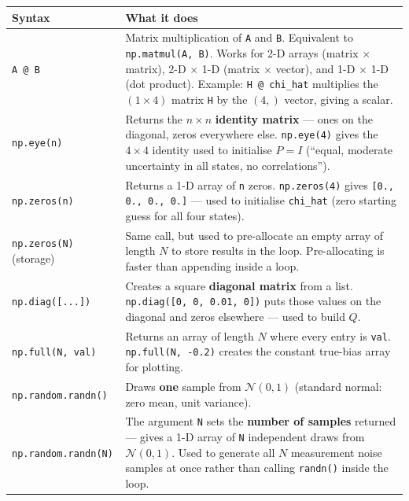 \documentclass[12pt, a4paper]{article}
\begin{document}
\begin{center}
\renewcommand{\arraystretch}{1.6}
\begin{tabular}{p{4.5cm} p{9.0cm}}
  \toprule
  \textbf{Syntax} & \textbf{What it does} \\
  \midrule
  \texttt{A @ B}
    & Matrix multiplication of \texttt{A} and \texttt{B}.
      Equivalent to \texttt{np.matmul(A, B)}.
      Works for 2-D arrays (matrix $\times$ matrix),
      2-D $\times$ 1-D (matrix $\times$ vector), and
      1-D $\times$ 1-D (dot product).
      Example: \texttt{H @ chi\_hat} multiplies the
      $(1\times4)$ matrix \texttt{H} by the $(4,)$ vector,
      giving a scalar. \\
  \texttt{np.eye(n)}
    & Returns the $n \times n$ \textbf{identity matrix} ---
      ones on the diagonal, zeros everywhere else.
      \texttt{np.eye(4)} gives the $4\times4$ identity used to
      initialise $P = I$ (``equal, moderate uncertainty in all
      states, no correlations''). \\
  \texttt{np.zeros(n)}
    & Returns a 1-D array of \texttt{n} zeros.
      \texttt{np.zeros(4)} gives \texttt{[0., 0., 0., 0.]} ---
      used to initialise \texttt{chi\_hat} (zero starting guess
      for all four states). \\
  \texttt{np.zeros(N)} (storage)
    & Same call, but used to pre-allocate an empty array of
      length $N$ to store results in the loop.
      Pre-allocating is faster than appending inside a loop. \\
  \texttt{np.diag([...])}
    & Creates a square \textbf{diagonal matrix} from a list.
      \texttt{np.diag([0, 0, 0.01, 0])} puts those values on
      the diagonal and zeros elsewhere --- used to build $Q$. \\
  \texttt{np.full(N, val)}
    & Returns an array of length $N$ where every entry is
      \texttt{val}.
      \texttt{np.full(N, -0.2)} creates the constant true-bias
      array for plotting. \\
  \texttt{np.random.randn()}
    & Draws \textbf{one} sample from $\mathcal{N}(0,1)$
      (standard normal: zero mean, unit variance). \\
  \texttt{np.random.randn(N)}
    & The argument \texttt{N} sets the \textbf{number of samples}
      returned --- gives a 1-D array of \texttt{N} independent
      draws from $\mathcal{N}(0,1)$.
      Used to generate all $N$ measurement noise samples at once
      rather than calling \texttt{randn()} inside the loop. \\

\end{tabular}
\end{center}
\end{document}
